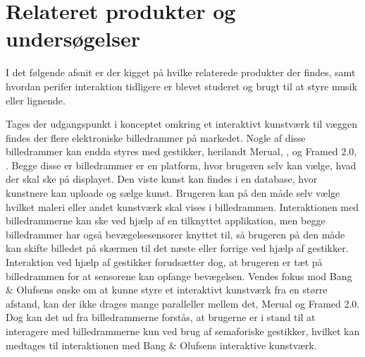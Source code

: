 \section{Relateret produkter og undersøgelser}
\label{RelateretProdukterOgUndersoegelser}

I det følgende afsnit er der kigget på hvilke relaterede produkter der findes, samt hvordan perifer interaktion tidligere er blevet studeret og brugt til at styre musik eller lignende.

Tages der udgangspunkt i konceptet omkring et interaktivt kunstværk til væggen findes der flere elektroniske billedrammer på markedet. Nogle af disse billedrammer kan endda styres med gestikker, herilandt Merual, \parencite{WEB:Meural}, og Framed 2.0, \parencite{WEB:Framed2.0}. Begge disse er billedrammer er en platform, hvor brugeren selv kan vælge, hvad der skal ske på displayet. Den viste kunst kan findes i en database, hvor kunstnere kan uploade og sælge kunst. Brugeren kan på den måde selv vælge hvilket maleri eller andet kunstværk skal vises i billedrammen. Interaktionen med billedrammerne kan ske ved hjælp af en tilknyttet applikation, men begge billedrammer har også bevægelsesensorer knyttet til, så brugeren på den måde kan skifte billedet på skærmen til det næste eller forrige ved hjælp af gestikker. Interaktion ved hjælp af gestikker forudsætter dog, at brugeren er tæt på billedrammen for at sensorene kan opfange bevægelsen. Vendes fokus mod Bang $\&$ Olufsens ønske om at kunne styre et interaktivt kunstværk fra en større afstand, kan der ikke drages mange paralleller mellem det, Merual og Framed 2.0. Dog kan det ud fra billedrammerne forstås, at brugerne er i stand til at interagere med billedrammerne kun ved brug af semaforiske gestikker, hvilket kan medtages til interaktionen med Bang $\&$ Olufsens interaktive kunstværk.

